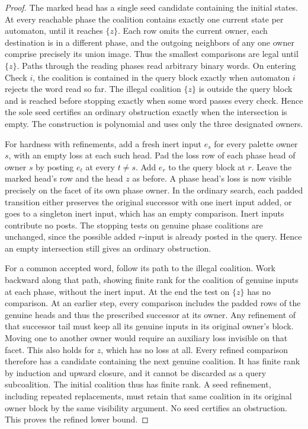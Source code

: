\begin{proof}
The marked head has a single seed candidate containing the
initial states. At every reachable phase the coalition
contains exactly one current state per automaton, until
it reaches $\{z\}$. Each row omits the current owner,
each destination is in a different phase, and the
outgoing neighbors of any one owner comprise precisely
its union image. Thus the smallest comparisons are legal
until $\{z\}$. Paths through the reading phases read
arbitrary binary words. On entering $\text{Check }i$,
the coalition is contained in the query block exactly
when automaton $i$ rejects the word read so far. The
illegal coalition $\{z\}$ is outside the query block
and is reached before stopping exactly when some word
passes every check. Hence the sole seed certifies an
ordinary obstruction exactly when the intersection is
empty. The construction is polynomial and uses only
the three designated owners.

For hardness with refinements, add a fresh inert input
$e_s$ for every palette owner $s$, with an empty loss at
each such head. Pad the loss row of each phase head of
owner $s$ by posting $e_t$ at every $t\ne s$. Add $e_r$
to the query block at $r$. Leave the marked head's row
and the head $z$ as before. A phase head's loss is now
visible precisely on the facet of its own phase owner.
In the ordinary search, each padded transition either
preserves the original successor with one inert input
added, or goes to a singleton inert input, which has
an empty comparison. Inert inputs contribute no posts.
The stopping tests on genuine phase coalitions are
unchanged, since the possible added $r$-input is already
posted in the query. Hence an empty intersection still
gives an ordinary obstruction.

For a common accepted word, follow its path to the
illegal coalition. Work backward along that path,
showing finite rank for the coalition of genuine inputs
at each phase, without the inert input. At the end the
test on $\{z\}$ has no comparison. At an earlier step,
every comparison includes the padded rows of the
genuine heads and thus the prescribed successor
at its owner. Any refinement of that successor tail
must keep all its genuine inputs in its original
owner's block. Moving one to another owner would
require an auxiliary loss invisible on that facet.
This also holds for $z$, which has no loss at all.
Every refined comparison therefore has a candidate
containing the next genuine coalition. It has finite
rank by induction and upward closure, and it cannot
be discarded as a query subcoalition. The initial
coalition thus has finite rank. A seed refinement,
including repeated replacements, must retain that
same coalition in its original owner block by the
same visibility argument. No seed certifies an
obstruction. This proves the refined lower bound.
\end{proof}

